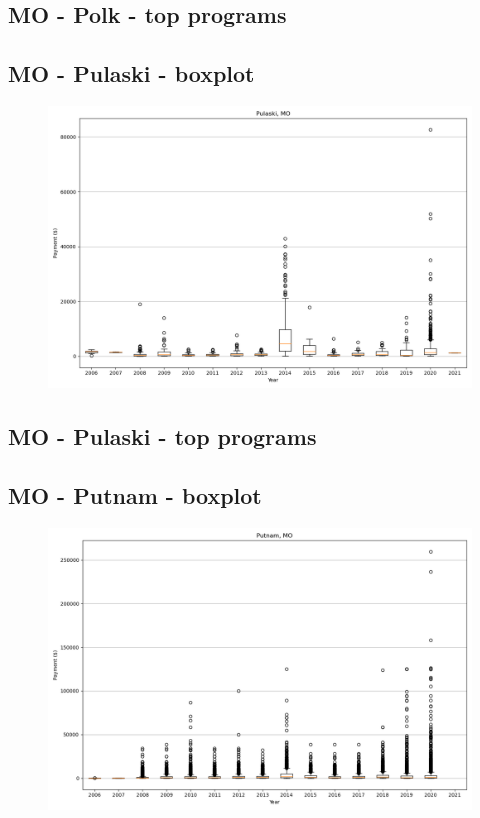 \subsection*{MO - Polk - top programs}

\newpage
\subsection*{MO - Pulaski - boxplot}
\begin{figure}[h]
\centering
\includegraphics[width=7in]{../output/boxplots/counties/Pulaski-MO_boxplot.png}
\end{figure}


\subsection*{MO - Pulaski - top programs}

\newpage
\subsection*{MO - Putnam - boxplot}
\begin{figure}[h]
\centering
\includegraphics[width=7in]{../output/boxplots/counties/Putnam-MO_boxplot.png}
\end{figure}


